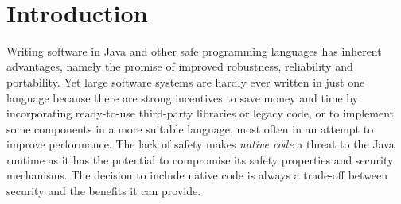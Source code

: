 \documentclass[a4paper,12pt,twoside,openright]{report}
\begin{document}

\pagestyle{empty}
\singlespacing

\onehalfspacing

\singlespacing


\setcounter{page}{0}
\pagestyle{plain}
\tableofcontents

\onehalfspacing
\newpage ~ \cleardoublepage %

\setcounter{page}{1} 

\chapter{Introduction}

Writing software in Java and other safe programming languages has inherent advantages, namely the promise of improved robustness, reliability and portability. Yet large software systems are hardly ever written in just one language because there are strong incentives to save money and time by incorporating ready-to-use third-party libraries or legacy code, or to implement some components in a more suitable language, most often in an attempt to improve performance. The lack of safety makes \emph{native code} a threat to the Java runtime as it has the potential to compromise its safety properties and security mechanisms. The decision to include native code is always a trade-off between security and the benefits it can provide.
 
\end{document}
